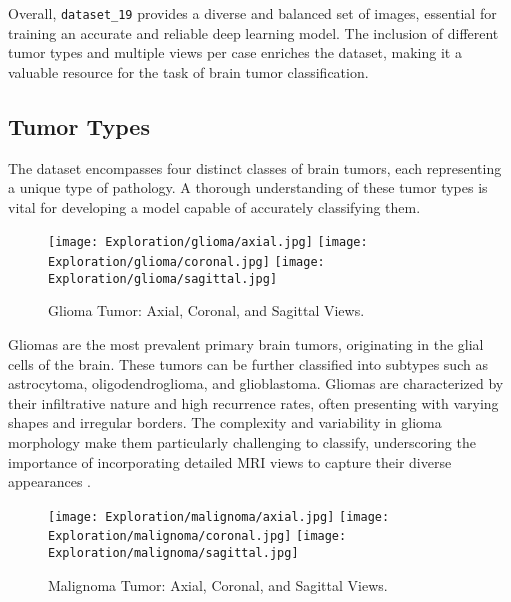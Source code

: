 Overall, \texttt{dataset\_19} provides a diverse and balanced set of images, essential for training an accurate and reliable deep learning model. The inclusion of different tumor types and multiple views per case enriches the dataset, making it a valuable resource for the task of brain tumor classification.

\subsection{Tumor Types}\label{tumor_types}

The dataset encompasses four distinct classes of brain tumors, each representing a unique type of pathology. A thorough understanding of these tumor types is vital for developing a model capable of accurately classifying them.

\begin{figure}[H]
  \begin{center}
    \texttt{[image: Exploration/glioma/axial.jpg]}
    \texttt{[image: Exploration/glioma/coronal.jpg]}
    \texttt{[image: Exploration/glioma/sagittal.jpg]}
  \end{center}
  \caption{Glioma Tumor: Axial, Coronal, and Sagittal Views.}\label{fig:glioma_views}
\end{figure}

Gliomas are the most prevalent primary brain tumors, originating in the glial cells of the brain. These tumors can be further classified into subtypes such as astrocytoma, oligodendroglioma, and glioblastoma. Gliomas are characterized by their infiltrative nature and high recurrence rates, often presenting with varying shapes and irregular borders. The complexity and variability in glioma morphology make them particularly challenging to classify, underscoring the importance of incorporating detailed MRI views to capture their diverse appearances \cite{abd-ellah_automatic_2024}.

\begin{figure}[H]
  \begin{center}
    \texttt{[image: Exploration/malignoma/axial.jpg]}
    \texttt{[image: Exploration/malignoma/coronal.jpg]}
    \texttt{[image: Exploration/malignoma/sagittal.jpg]}
  \end{center}
  \caption{Malignoma Tumor: Axial, Coronal, and Sagittal Views.}\label{fig:malignoma_views}
\end{figure}



